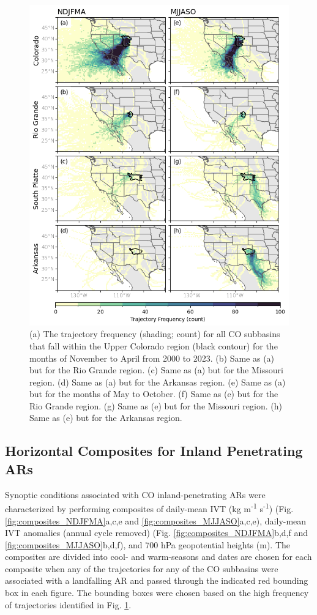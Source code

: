 \documentclass[draft]{agujournal2019}
\begin{document}
\begin{figure}
\noindent\includegraphics[width=\textwidth, height=\textheight, keepaspectratio]{fig4.png}
\caption{(a) The trajectory frequency (shading; count) for all CO subbasins that fall within the Upper Colorado region (black contour) for the months of November to April from 2000 to 2023. (b) Same as (a) but for the Rio Grande region. (c) Same as (a) but for the Missouri region. (d) Same as (a) but for the Arkansas region. (e) Same as (a) but for the months of May to October. (f) Same as (e) but for the Rio Grande region. (g) Same as (e) but for the Missouri region. (h) Same as (e) but for the Arkansas region.}
\label{fig:heatmaps}
\end{figure}

\subsection{Horizontal Composites for Inland Penetrating ARs}
\label{sec:results:composite_analysis}

Synoptic conditions associated with CO inland-penetrating ARs were characterized by performing composites of daily-mean IVT (kg m\textsuperscript{-1} s\textsuperscript{-1}) (Fig. \ref{fig:composites_NDJFMA}a,c,e and \ref{fig:composites_MJJASO}a,c,e), daily-mean IVT anomalies (annual cycle removed) (Fig. \ref{fig:composites_NDJFMA}b,d,f and \ref{fig:composites_MJJASO}b,d,f), and 700 hPa geopotential heights (m). The composites are divided into cool- and warm-seasons and dates are chosen for each composite when any of the trajectories for any of the CO subbasins were associated with a landfalling AR and passed through the indicated red bounding box in each figure. The bounding boxes were chosen based on the high frequency of trajectories identified in Fig. \ref{fig:heatmaps}. 
\end{document}
